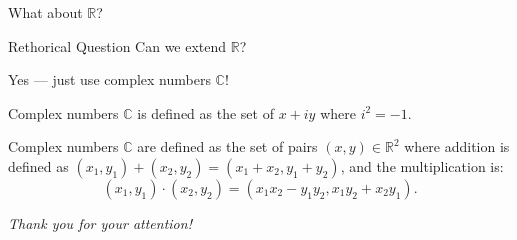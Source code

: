 \documentclass{beamer}
\begin{document}
    \begin{frame}{What about $\mathbb{R}$?}
        \begin{alertblock}{Rethorical Question}
           Can we extend $\mathbb{R}$?
        \end{alertblock}

        Yes --- just use complex numbers $\mathbb{C}$!

        \begin{definition}
            Complex numbers $\mathbb{C}$ is defined as the set of $x+iy$ where $i^2=-1$.
        \end{definition}

        \begin{definition}
            Complex numbers $\mathbb{C}$ are defined as the set of pairs $(x,y) \in \mathbb{R}^2$ where addition is defined as $(x_1,y_1)+(x_2,y_2)=(x_1+x_2,y_1+y_2)$, and the multiplication is:
            \begin{equation*}
                (x_1,y_1) \cdot (x_2,y_2) = (x_1x_2-y_1y_2,x_1y_2+x_2y_1).
            \end{equation*}
        \end{definition}
    \end{frame}


    \begin{frame}{}
        \centering \Large
        \emph{Thank you for your attention!}
      \end{frame}
\end{document}
